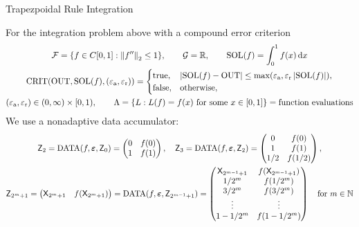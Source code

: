 \documentclass[10pt,compress,xcolor={usenames,dvipsnames},aspectratio=169]{beamer}
\DeclareMathOperator{\DATA}{DATA}
\DeclareMathOperator{\SOL}{SOL}
\DeclareMathOperator{\OUT}{OUT}
\DeclareMathOperator{\CRIT}{CRIT}
\newcommand{\ttrue}{\text{true}}
\newcommand{\tfalse}{\text{false}}
\newcommand{\tolabs}{\varepsilon_{\text{a}}}
\newcommand{\tolrel}{\varepsilon_{\text{r}}}
\begin{document}
\begin{frame}{Trapezpoidal Rule Integration}

\vspace{-2ex}
For the integration problem above with a \alert{compound error criterion}
\vspace{-1ex}
\begin{gather*}
	\cf = \{f \in C[0,1] : \norm[2]{f''} \le 1\}, \qquad 
	\cg  = \reals,  \qquad
	\SOL(f) = \int_0^1 f(x) \, \dif x  \\
	\CRIT(\OUT, \SOL(f),(\tolabs, \tolrel))  = \begin{cases} \ttrue, & \abs{\SOL(f) - \OUT} \le \max(\tolabs,\tolrel \abs{\SOL(f)}), \\
		\tfalse, & \text{otherwise}, 
		\end{cases} \\
	 (\tolabs,\tolrel) \in (0,\infty) \times [0,1), \qquad
	 \Lambda  = \{L :  L(f) = f(x) \text{ for some } x \in [0,1]\} = \text{function evaluations}
\end{gather*}
We use a \alert{nonadaptive} data accumulator:
\vspace{-1ex}
\begin{gather*}
\mZ_2 = \DATA(f,\veps,\mZ_{0})  = \begin{pmatrix} 0 & f(0) \\ 1 & f(1) \end{pmatrix},  \quad
\mZ_3 = \DATA(f,\veps,\mZ_{2}) = \begin{pmatrix} 0 & f(0) \\ 1 & f(1) \\ 1/2 & f(1/2)\end{pmatrix}, \\
\mZ_{2^{m}+1} =  \begin{pmatrix} \mX_{2^{m}+1} & f(\mX_{2^{m}+1}) \end{pmatrix} = \DATA(f,\veps,\mZ_{2^{m-1}+1}) = \begin{pmatrix} \mX_{2^{m-1}+1} & f(\mX_{2^{m-1}+1}) \\ 1/2^m & f(1/2^m) \\ 3/2^m & f(3/2^m) \\ \vdots & \vdots \\ 1 - 1/2^m & f(1 - 1/2^m)\end{pmatrix} \quad \text{for } m \in \naturals
\end{gather*}

\end{frame}
\end{document}
